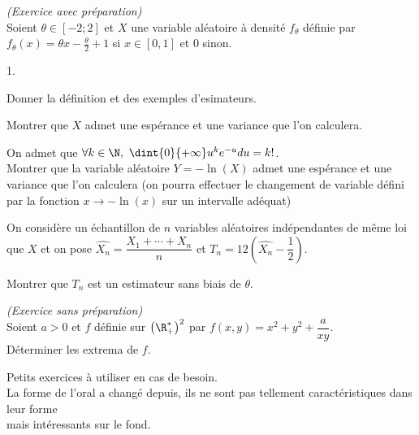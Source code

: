 \documentclass[11pt]{article}%
\begin{document}
\newpage


\begin{exercice}{\it (Exercice avec préparation)}~\\
  Soient $\theta \in \left[ -2;2\right] $ et $X$ une variable
  aléatoire à densité $f_{\theta }$ définie par $f_{\theta }\left(
    x\right) =\theta x-\frac{\theta }{2}+1$ si $x\in \left[
    0,1\right]$ et $0$ sinon.

  \begin{noliste}{1.}
  \item Donner la définition et des exemples d'esimateurs.

  \item Montrer que $X$ admet une espérance et une variance que l'on
    calculera.

  \item On admet que $\forall k\in \N,\mathbb{\ }\dint{0}{+\infty
    }u^{k}e^{-u}du=k!$.\\
    Montrer que la variable aléatoire $Y=-\ln \left( X\right) $ admet
    une espérance et une variance que l'on calculera (on pourra
    effectuer le changement de variable défini par la fonction
    $x\rightarrow -\ln \left( x\right) $ sur un intervalle adéquat)

    On considère un échantillon de $n$ variables aléatoires
    indépendantes de même loi que $X$ et on pose $\widehat{X_{n}} =
    \dfrac{X_{1}+\cdots +X_{n}}{n}$ et $T_{n} = 12\left(
      \widehat{X_{n}}-\dfrac{1}{2}\right) $.

  \item Montrer que $T_{n}$ est un estimateur sans biais de $\theta $.
  \end{noliste}
\end{exercice}

\addtocounter{exercice}{-1}
\begin{exercice}{\it (Exercice sans préparation)}~\\
  Soient $a>0$ et $f$ définie sur $\left( \R_{+}^{\ast }\right) ^{2}$
  par $f\left( x,y\right) =x^{2}+y^{2}+\dfrac{a}{xy}$.\\
  Déterminer les extrema de $f$.
\end{exercice}


\newpage


\begin{center} 
  Petits exercices à utiliser en cas de besoin. \\
  La forme de l'oral a changé depuis, ils ne sont pas tellement
  caractéristiques dans leur forme \\
  mais intéressants sur le fond. 
\end{center}
\end{document}
